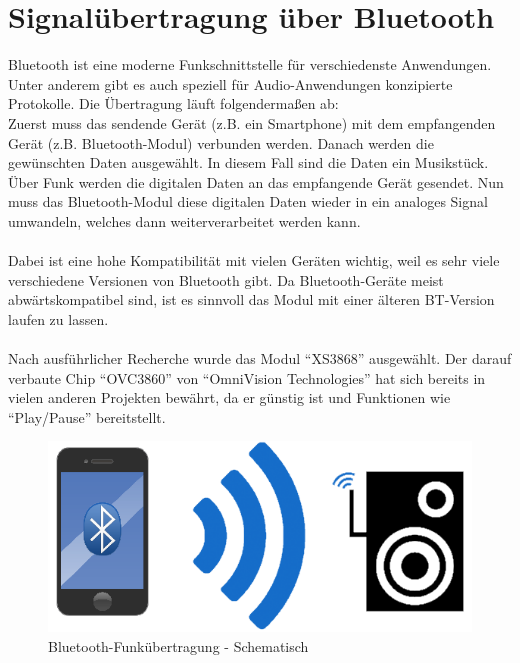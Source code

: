 \section{Signalübertragung über Bluetooth}\label{sec:3.3}
Bluetooth ist eine moderne Funkschnittstelle für verschiedenste Anwendungen.
Unter anderem gibt es auch speziell für Audio-Anwendungen konzipierte Protokolle.
Die Übertragung läuft folgendermaßen ab:
\\
Zuerst muss das sendende Gerät (z.B. ein Smartphone) mit dem empfangenden Gerät (z.B. Bluetooth-Modul) verbunden werden.
Danach werden die gewünschten Daten ausgewählt.
In diesem Fall sind die Daten ein Musikstück.
Über Funk werden die digitalen Daten an das empfangende Gerät gesendet.
Nun muss das Bluetooth-Modul diese digitalen Daten wieder in ein analoges Signal umwandeln, welches dann weiterverarbeitet werden kann.
\\ \\
Dabei ist eine hohe Kompatibilität mit vielen Geräten wichtig, weil es sehr viele verschiedene Versionen von Bluetooth gibt.
Da Bluetooth-Geräte meist abwärtskompatibel sind, ist es sinnvoll das Modul mit einer älteren BT-Version laufen zu lassen.
\\ \\
Nach ausführlicher Recherche wurde das Modul \enquote{XS3868} ausgewählt.
Der darauf verbaute Chip \enquote{OVC3860} von \enquote{OmniVision Technologies} hat sich bereits in vielen anderen Projekten bewährt, da er günstig ist und Funktionen wie \enquote{Play/Pause} bereitstellt.

\begin{figure} [H]
	\centering
	\includegraphics[width=1\textwidth]{img/Grundlagen/Bluetooth/BT-uebertragung-cut.jpg}
	\caption[Bluetooth-Funkübertragung - Schematisch]{Bluetooth-Funkübertragung - Schematisch\footnotemark}
	\label{fig:3.3.1}
\end{figure}



